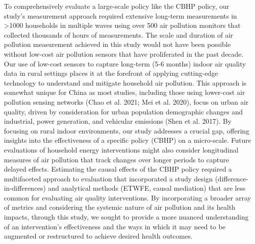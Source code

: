 \documentclass[
  letterpaper,
  DIV=11,
  numbers=noendperiod]{scrartcl}
\providecommand{\DIFadd}[1]{{\protect\color{blue}\uwave{#1}}} %
\providecommand{\DIFaddbegin}{} %
\providecommand{\DIFaddend}{} %
\providecommand{\DIFdelbegin}{} %
\providecommand{\DIFdelend}{} %
\newcommand{\DIFscaledelfig}{0.5}
\newlength{\DIFdelgraphicswidth} %
\newlength{\DIFdelgraphicsheight} %
\newcommand{\DIFaddincludegraphics}[2][]{{\color{blue}\fbox{\DIFOincludegraphics[#1]{#2}}}} %
\newcommand{\DIFdelincludegraphics}[2][]{%
\sbox{\DIFdelgraphicsbox}{\DIFOincludegraphics[#1]{#2}}%
\settoboxwidth{\DIFdelgraphicswidth}{\DIFdelgraphicsbox} %
\settoboxtotalheight{\DIFdelgraphicsheight}{\DIFdelgraphicsbox} %
\scalebox{\DIFscaledelfig}{%
\parbox[b]{\DIFdelgraphicswidth}{\usebox{\DIFdelgraphicsbox}\\[-\baselineskip] \rule{\DIFdelgraphicswidth}{0em}}\llap{\resizebox{\DIFdelgraphicswidth}{\DIFdelgraphicsheight}{%
\setlength{\unitlength}{\DIFdelgraphicswidth}%
\begin{picture}(1,1)%
\thicklines\linethickness{2pt} %
{\color[rgb]{1,0,0}\put(0,0){\framebox(1,1){}}}%
{\color[rgb]{1,0,0}\put(0,0){\line( 1,1){1}}}%
{\color[rgb]{1,0,0}\put(0,1){\line(1,-1){1}}}%
\end{picture}%
}\hspace*{3pt}}} %
} %
\DeclareRobustCommand{\DIFaddbegin}{\DIFOaddbegin \let\includegraphics\DIFaddincludegraphics} %
\DeclareRobustCommand{\DIFaddend}{\DIFOaddend \let\includegraphics\DIFOincludegraphics} %
\DeclareRobustCommand{\DIFdelbegin}{\DIFOdelbegin \let\includegraphics\DIFdelincludegraphics} %
\DeclareRobustCommand{\DIFdelend}{\DIFOaddend \let\includegraphics\DIFOincludegraphics} %
\begin{document}
To comprehensively evaluate a large-scale policy like the CBHP policy,
our study's measurement approach required extensive long-term
measurements in \textgreater1000 households in multiple waves using over
500 air pollution monitors that collected thousands of hours of
measurements. The scale and duration of air pollution measurement
achieved in this study would not have been possible without low-cost air
pollution sensors that have proliferated in the past decade. Our use of
low-cost sensors to capture long-term (5-6 months) indoor air quality
data in rural settings places it at the forefront of applying
cutting-edge technology to understand and mitigate household air
pollution. This approach is somewhat unique for China as most studies,
including those using lower-cost air pollution sensing networks (Chao et
al. 2021; Mei et al. 2020), focus on urban air quality, driven by
consideration for urban population demographic changes and industrial,
power generation, and vehicular emissions (Shen et al. 2017). By
focusing on rural indoor environments, our study addresses a crucial
gap, offering insights into the effectiveness of a specific policy
(CBHP) on a micro-scale. Future evaluations of household energy
interventions might also consider longitudinal measures of air pollution
that track changes over longer periods to capture delayed effects.
Estimating the causal effects of the CBHP policy required a multifaceted
approach to evaluation that incorporated a study design
(difference-in-differences) and analytical methods (ETWFE, causal
mediation) that are less common for evaluating air quality
interventions. By incorporating a broader array of metrics and
considering the systemic nature of air pollution and its health impacts,
through this study, we sought to provide a more nuanced understanding of
an intervention's effectiveness and the ways in which it may need to be
augmented or restructured to achieve desired health outcomes.

\DIFdelbegin %
\DIFdelend \DIFaddbegin \subsection{\DIFadd{Assumptions, strengths, and
limitations}}\label{assumptions-strengths-and-limitations}
\DIFaddend 
\end{document}
